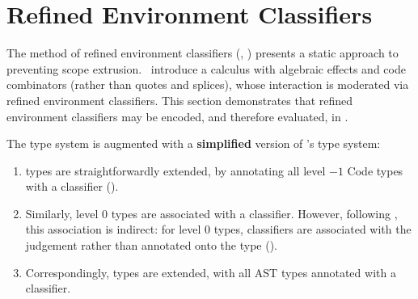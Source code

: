 
\section{Refined Environment Classifiers}\label{section:refined-environment-classifiers-formal}
The method of refined environment classifiers (, ) presents a static approach to preventing scope extrusion.\ \citet{isoda-24} introduce a calculus with algebraic effects and code combinators (rather than quotes and splices), whose interaction is moderated via refined environment classifiers. This section demonstrates that refined environment classifiers may be encoded, and therefore evaluated, in \sourceLang{}. 

The \sourceLang{} type system is augmented with a \textbf{simplified} version of \citeauthor{isoda-24}'s type system:

\begin{enumerate} 
  \item \sourceLang{} types are straightforwardly extended, by annotating all level $-1$ \textsf{Code} types with a classifier ().
  \item Similarly, level $0$ types are associated with a classifier. However, following \citet{isoda-24}, this association is indirect: for level $0$ types, classifiers are associated with the judgement rather than annotated onto the type (). 
  \item Correspondingly, \coreLang{} types are extended, with all \textsf{AST} types annotated with a classifier.
\end{enumerate}

